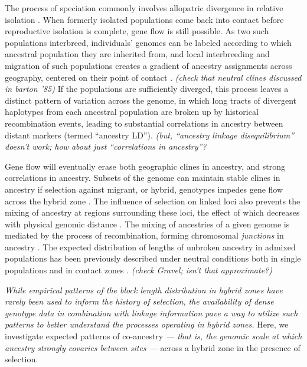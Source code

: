 \documentclass[11pt,letterpaper]{article}
\newcommand{\alisa}[1]{{\em \color{red} #1}}
\newcommand{\plr}[1]{{\em \color{blue} #1}}
\newcommand{\yb}[1]{{\em \color{magenta} #1}}
\begin{document}
The process of speciation commonly involves allopatric divergence in relative isolation \citep{Coyne2004}.  
When formerly isolated populations come back into contact 
before reproductive isolation is complete, gene flow is still possible. 
As two such populations interbreed,
individuals' genomes can be labeled according to which ancestral population they are inherited from,
and local interbreeding and migration of such populations
creates a gradient of ancestry assignments across geography,
centered on their point of contact \citep{Barton1985}. 
\plr{(check that neutral clines discussed in barton '85)}
If the populations are sufficiently diverged,
this process leaves a distinct pattern of variation across the genome, 
in which long tracts of divergent haplotypes from each ancestral population  
are broken up by historical recombination events,
leading to substantial correlations in ancestry between distant markers
(termed ``ancestry LD'').
\plr{(but, ``ancestry linkage disequilibrium'' doesn't work;
how about just ``correlations in ancestry''?}

Gene flow will eventually erase 
both geographic clines in ancestry, and strong correlations in ancestry.
Subsets of the genome can maintain stable clines in ancestry if selection against migrant, or hybrid, genotypes impedes gene flow across the hybrid zone \citep{Barton1979a}. The influence of selection on linked loci also prevents the mixing of ancestry at regions surrounding these loci, the effect of which decreases with physical genomic distance \citep{Barton1986,Barton1983}. 
The mixing of ancestries of a given genome is mediated by 
the process of recombination, forming chromosomal \emph{junctions} in ancestry \citep{Fisher1954, Chapman2002, Baird2003}.   
The expected distribution of lengths of unbroken ancestry in admixed populations has been previously described under neutral conditions both in single populations and in contact zones \citep[e.g.][]{Gravel2012,Sedghifar2015}.  
\plr{(check Gravel; isn't that approximate?)}

\yb{While empirical patterns of the block length distribution in hybrid zones have rarely been used to inform the history of selection,}  \alisa{the availability of dense genotype data in combination with linkage information pave a way to utilize such patterns to better understand the processes operating in hybrid zones. } %
Here, we investigate expected patterns of co-ancestry \yb{ --- that is, the genomic scale at which ancestry strongly covaries between sites --- } across a hybrid zone in the presence of selection. 
\end{document}
